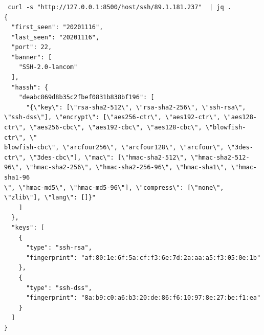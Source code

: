 \documentclass{beamer}
\begin{document}
\begin{frame}[t,fragile]
        \frametitle{}
\lstset{breaklines=true, language=JavaScript}
\begin{lstlisting}
 curl -s "http://127.0.0.1:8500/host/ssh/89.1.181.237"  | jq .
{
  "first_seen": "20201116",
  "last_seen": "20201116",
  "port": 22,
  "banner": [
    "SSH-2.0-lancom"
  ],
  "hassh": {
    "deabc869d8b35c2fbef0831b838bf196": [
      "{\"key\": [\"rsa-sha2-512\", \"rsa-sha2-256\", \"ssh-rsa\", \"ssh-dss\"], \"encrypt\": [\"aes256-ctr\", \"aes192-ctr\", \"aes128-ctr\", \"aes256-cbc\", \"aes192-cbc\", \"aes128-cbc\", \"blowfish-ctr\", \"
blowfish-cbc\", \"arcfour256\", \"arcfour128\", \"arcfour\", \"3des-ctr\", \"3des-cbc\"], \"mac\": [\"hmac-sha2-512\", \"hmac-sha2-512-96\", \"hmac-sha2-256\", \"hmac-sha2-256-96\", \"hmac-sha1\", \"hmac-sha1-96
\", \"hmac-md5\", \"hmac-md5-96\"], \"compress\": [\"none\", \"zlib\"], \"lang\": []}"
    ]
  },
  "keys": [
    {
      "type": "ssh-rsa",
      "fingerprint": "af:80:1e:6f:5a:cf:f3:6e:7d:2a:aa:a5:f3:05:0e:1b"
    },
    {
      "type": "ssh-dss",
      "fingerprint": "8a:b9:c0:a6:b3:20:de:86:f6:10:97:8e:27:be:f1:ea"
    }
  ]
}
\end{lstlisting}
\end{frame}
\end{document}
